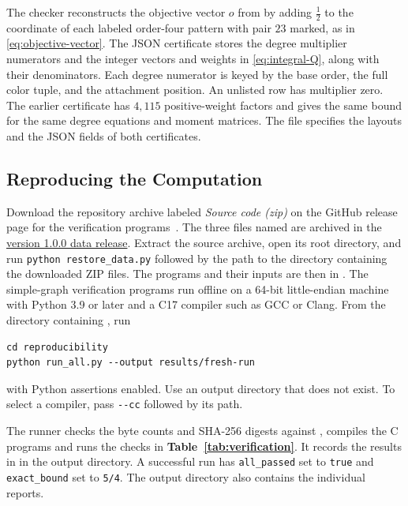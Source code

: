 \documentclass[preprint,11pt,numbers]{elsarticle-arxiv}
\numberwithin{equation}{section}
\theoremstyle{definition}
\begin{document}
The checker reconstructs the objective vector $o$ from
 by adding $\frac{1}{2}$ to the coordinate of each
labeled order-four pattern with pair $23$ marked, as in
\eqref{eq:objective-vector}. The JSON certificate stores the
degree multiplier numerators and the integer vectors and weights in
\eqref{eq:integral-Q}, along with their denominators.
Each degree numerator is keyed by the base order, the full color
tuple, and the attachment position. An unlisted row has multiplier
zero.
The earlier certificate 
has $4{,}115$ positive-weight factors and gives the same bound
for the same degree equations and moment matrices. The file
 specifies the layouts and the
JSON fields of both certificates.
\relax\space%
\subsection{Reproducing the Computation}\label{app:reproduction}

Download the repository archive labeled \emph{Source code (zip)}
on the GitHub release page for the verification programs~\cite{FGSTCode}.
The three files named 
are archived in the
\href{https://github.com/rewere143-cell/fgst-strong-clique/releases/tag/v1.0.0}{version 1.0.0 data release}.
Extract the source archive, open its root
directory, and run \texttt{python restore\_data.py} followed by the
path to the directory containing the downloaded ZIP files. The
programs and their inputs are then in .
The simple-graph verification programs run offline on a 64-bit
little-endian machine with Python 3.9 or later and a C17 compiler
such as GCC or Clang. From the directory containing
, run
\begin{verbatim}
cd reproducibility
python run_all.py --output results/fresh-run
\end{verbatim}
with Python assertions enabled. Use an output directory that does
not exist. To select a compiler, pass \verb|--cc| followed by its path.

The runner checks the byte counts and SHA-256 digests against
, compiles the C programs and runs the checks
in \textbf{Table~\ref{tab:verification}}. It records the results in
 in the output directory. A successful run has
\verb|all_passed| set to \verb|true| and \verb|exact_bound| set to
\verb|5/4|. The output directory also contains the individual reports.
\end{document}
